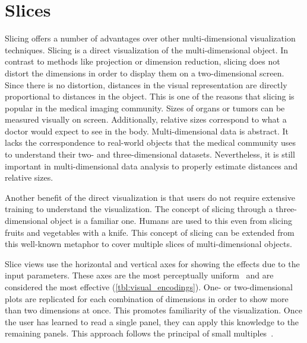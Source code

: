 
\section{Slices}
\label{sec:slicing-advantages}

Slicing offers a number of advantages over other multi-dimensional
visualization techniques. Slicing is a direct visualization of the
multi-dimensional object. In contrast to methods like projection or dimension
reduction, slicing does not distort the dimensions in order to display them on
a two-dimensional screen. Since there is no distortion, distances in the visual
representation are directly proportional to distances in the object. This is
one of the reasons that slicing is popular in the medical imaging community.
Sizes of organs or tumors can be measured visually on screen. Additionally,
relative sizes correspond to what a doctor would expect to see in the body.
Multi-dimensional data is abstract. It lacks the correspondence to real-world
objects that the medical community uses to understand their two- and
three-dimensional datasets. Nevertheless, it is still important in
multi-dimensional data analysis to properly estimate distances and relative
sizes. 

Another benefit of the direct visualization is that users do not require
extensive training to understand the visualization. The concept of slicing
through a three-dimensional object is a familiar one. Humans are used to this
even from slicing fruits and vegetables with a knife. This concept of slicing
can be extended from this well-known metaphor to cover multiple slices of
multi-dimensional objects.

Slice views use the horizontal and vertical axes for showing the effects due to
the input parameters. These axes are the most perceptually
uniform~\cite{Stevens:1957} and are considered the most effective
(\autoref{tbl:visual_encodings}). One- or two-dimensional
plots are replicated for each combination of dimensions in order to show more
than two dimensions at once. This promotes familiarity of the visualization.
Once the user has learned to read a single panel, they can apply this knowledge
to the remaining panels. This approach follows the principal of small
multiples~\cite{Archambault:2011}. 

